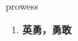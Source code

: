 
\begin{frame}
{\huge prowess}
\begin{center}
\begin{enumerate}\Large
  \item \textbf{英勇，勇敢}
\end{enumerate}
\end{center}
\end{frame}
